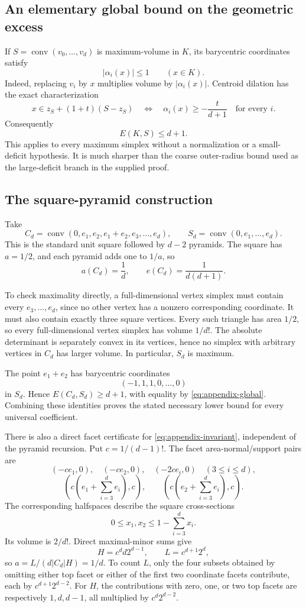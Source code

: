 \documentclass[11pt,letterpaper]{article}
\newcommand{\conv}{\operatorname{conv}}
\begin{document}
\subsection{An elementary global bound on the geometric excess}
If $S=\conv(v_0,\ldots,v_d)$ is maximum-volume in $K$, its barycentric
coordinates satisfy
\[
 |\alpha_i(x)|\le1\qquad(x\in K).
\]
Indeed, replacing $v_i$ by $x$ multiplies volume by $|\alpha_i(x)|$.
Centroid dilation has the exact characterization
\[
 x\in z_S+(1+t)(S-z_S)
 \quad\Longleftrightarrow\quad
 \alpha_i(x)\ge-\frac{t}{d+1}\quad\text{for every }i.
\]
Consequently
\begin{equation}\label{eq:appendix-global}
 E(K,S)\le d+1.
\end{equation}
This applies to every maximum simplex without a normalization or a
small-deficit hypothesis. It is much sharper than the coarse outer-radius
bound used as the large-deficit branch in the supplied proof.

\subsection{The square-pyramid construction}
Take
\[
 C_d=\conv(0,e_1,e_2,e_1+e_2,e_3,\ldots,e_d),\qquad
 S_d=\conv(0,e_1,\ldots,e_d).
\]
This is the standard unit square followed by $d-2$ pyramids. The square
has $a=1/2$, and each pyramid adds one to $1/a$, so
\begin{equation}\label{eq:appendix-invariant}
 a(C_d)=\frac1d,\qquad e(C_d)=\frac1{d(d+1)}.
\end{equation}

To check maximality directly, a full-dimensional vertex simplex must
contain every $e_3,\ldots,e_d$, since no other vertex has a nonzero
corresponding coordinate. It must also contain exactly three square
vertices. Every such triangle has area $1/2$, so every full-dimensional
vertex simplex has volume $1/d!$. The absolute determinant is separately
convex in its vertices, hence no simplex with arbitrary vertices in $C_d$
has larger volume. In particular, $S_d$ is maximum.

The point $e_1+e_2$ has barycentric coordinates
\[
 (-1,1,1,0,\ldots,0)
\]
in $S_d$. Hence $E(C_d,S_d)\ge d+1$, with equality by
\eqref{eq:appendix-global}. Combining these identities proves the stated
necessary lower bound for every universal coefficient.

There is also a direct facet certificate for
\eqref{eq:appendix-invariant}, independent of the pyramid recursion.
Put $c=1/(d-1)!$. The facet area-normal/support pairs are
\[
 (-ce_1,0),\quad(-ce_2,0),\quad(-2ce_i,0)\quad(3\le i\le d),
\]
\[
 \left(c\left(e_1+\sum_{i=3}^d e_i\right),c\right),\qquad
 \left(c\left(e_2+\sum_{i=3}^d e_i\right),c\right).
\]
The corresponding halfspaces describe the square cross-sections
\[
 0\le x_1,x_2\le1-\sum_{i=3}^d x_i.
\]
Its volume is $2/d!$. Direct maximal-minor sums give
\[
 H=c^d d2^{d-1},\qquad L=c^{d+1}2^d,
\]
so $a=L/(d|C_d|H)=1/d$. To count $L$, only the four subsets obtained by
omitting either top facet or either of the first two coordinate facets
contribute, each by $c^{d+1}2^{d-2}$. For $H$, the contributions with zero,
one, or two top facets are respectively $1,d,d-1$, all multiplied by
$c^d2^{d-2}$.
\end{document}

